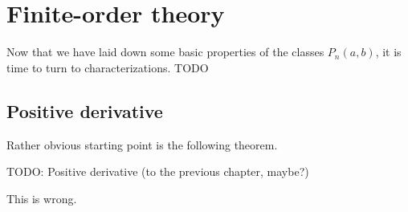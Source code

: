 \chapter{Finite-order theory}

Now that we have laid down some basic properties of the classes $P_{n}(a, b)$, it is time to turn to characterizations. TODO

\section{Positive derivative}

Rather obvious starting point is the following theorem.

\begin{lause}
	TODO: Positive derivative (to the previous chapter, maybe?)
\end{lause}

This is wrong.